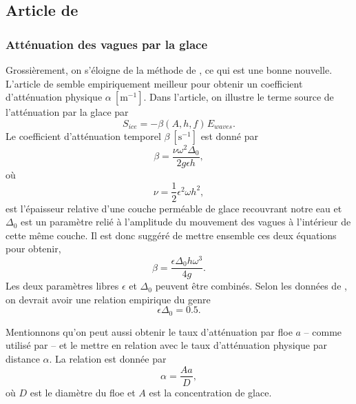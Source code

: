 \documentclass[10pt]{article}
\numberwithin{equation}{section}
\newcommand{\pt}{\hspace{1pt}} %
\begin{document}
\subsection{Article de \Textcite{auclair2022model}}
\label{sec:orgd2a6075}


\subsubsection{Atténuation des vagues par la glace}
\label{sec:orgc36c9b6}
Grossièrement, on s'éloigne de la méthode de \Textcite{Kohout2011wave}, ce qui est une bonne nouvelle.
L'article de \Textcite{sutherland2019two} semble empiriquement meilleur pour obtenir un coefficient d'atténuation physique \(\alpha\ [\mathrm{m}^{-1}]\).
Dans l'article, on illustre le terme source de l'atténuation par la glace par
\begin{equation}
   S_{ice} = - \beta(A,h,f)\pt E_{waves}.
\end{equation}
Le coefficient d'atténuation temporel \(\beta\ [\mathrm{s}^{-1}]\) est donné par 
\begin{equation}
   \beta = \frac{\nu \omega^2 \Delta_0}{2g\epsilon h},
\end{equation}
où
\begin{equation}
   \nu = \frac{1}{2} \epsilon^2 \omega h^2,
\end{equation}
est l'épaisseur relative d'une couche perméable de glace recouvrant notre eau et \(\Delta_0\) est un paramètre relié à l'amplitude du mouvement des vagues à l'intérieur de cette même couche.
Il est donc suggéré de mettre ensemble ces deux équations pour obtenir,
\begin{equation}
   \beta = \frac{\epsilon \Delta_0 h \omega^3}{4g}.
\end{equation}
Les deux paramètres libres \(\epsilon\) et \(\Delta_0\) peuvent être combinés.
Selon les données de \Textcite{sutherland2019two}, on devrait avoir une relation empirique du genre
\begin{equation}
   \epsilon \Delta_0 = 0.5.
\end{equation}

Mentionnons qu'on peut aussi obtenir le taux d'atténuation par floe \(a\) -- comme utilisé par \Textcite{Kohout2011wave} -- et le mettre en relation avec le taux d'atténuation physique par distance \(\alpha\). 
La relation est donnée par
\begin{equation}
   \alpha = \frac{A a}{D},
\end{equation}
où \(D\) est le diamètre du floe et \(A\) est la concentration de glace.
\end{document}
